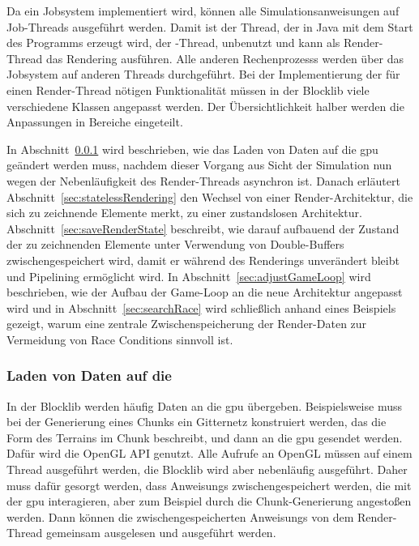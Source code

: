 Da ein Jobsystem implementiert wird, können alle Simulationsanweisungen auf Job-Threads ausgeführt werden. Damit ist der Thread, der in Java mit dem Start des Programms erzeugt wird, der -Thread, unbenutzt und kann als Render-Thread das Rendering ausführen. Alle anderen \glspl{Rechenprozess} werden über das Jobsystem auf anderen Threads durchgeführt. Bei der Implementierung der für einen Render-Thread nötigen Funktionalität müssen in der Blocklib viele verschiedene Klassen angepasst werden. Der Übersichtlichkeit halber werden die Anpassungen in Bereiche eingeteilt. 

In Abschnitt~\ref{sec:loader} wird beschrieben, wie das Laden von Daten auf die \ac{gpu} geändert werden muss, nachdem dieser Vorgang aus Sicht der Simulation nun wegen der Nebenläufigkeit des Render-Threads asynchron ist. Danach erläutert Abschnitt~\ref{sec:statelessRendering} den Wechsel von einer Render-Architektur, die sich zu zeichnende Elemente merkt, zu einer zustandslosen Architektur. Abschnitt~\ref{sec:saveRenderState} beschreibt, wie darauf aufbauend der Zustand der zu zeichnenden Elemente unter Verwendung von Double-Buffers zwischengespeichert wird, damit er während des Renderings unverändert bleibt und Pipelining ermöglicht wird. In Abschnitt~\ref{sec:adjustGameLoop} wird beschrieben, wie der Aufbau der Game-Loop an die neue Architektur angepasst wird und in Abschnitt~\ref{sec:searchRace} wird schließlich anhand eines Beispiels gezeigt, warum eine zentrale Zwischenspeicherung der Render-Daten zur Vermeidung von Race Conditions sinnvoll ist.

\subsubsection{Laden von Daten auf die }\label{sec:loader}
In der Blocklib werden häufig Daten an die \ac{gpu} übergeben. Beispielsweise muss bei der Generierung eines Chunks ein Gitternetz konstruiert werden, das die Form des Terrains im Chunk beschreibt, und dann an die \ac{gpu} gesendet werden. Dafür wird die OpenGL API genutzt. Alle Aufrufe an OpenGL müssen auf einem Thread ausgeführt werden, die Blocklib wird aber nebenläufig ausgeführt. Daher muss dafür gesorgt werden, dass \glspl{Anweisung} zwischengespeichert werden, die mit der \ac{gpu} interagieren, aber zum Beispiel durch die Chunk-Generierung angestoßen werden. Dann können die zwischengespeicherten \glspl{Anweisung} von dem Render-Thread gemeinsam ausgelesen und ausgeführt werden. 

